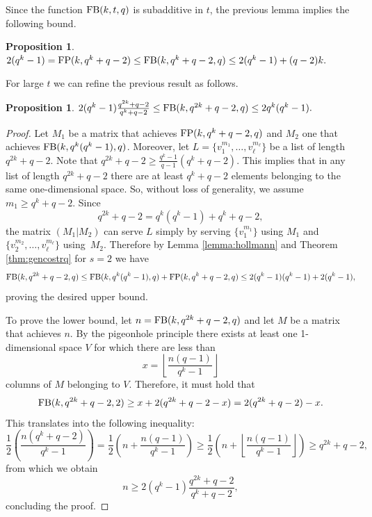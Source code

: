 \documentclass[11pt,a4paper]{article}
\theoremstyle{definition}
\newtheorem{proposition}[theorem]{Proposition}
\newcommand{\fb}{\textnormal{FB}}
\newcommand{\fp}{\textnormal{FP}}
\begin{document}
Since the function $\fb(k,t,q)$ is subadditive in $t$, the previous lemma implies the following bound.

\begin{proposition}\label{proposition:conjbound}
$2(q^k-1)=\fp(k,q^k+q-2)\leq\fb(k,q^k+q-2,q)\leq 2(q^k-1)+(q-2)k.$
\end{proposition}

For large $t$ we can refine the previous result as follows.

\begin{proposition}
$2(q^k-1)\frac{q^{2k}+q-2}{q^k+q-2}\leq\fb(k,q^{2k}+q-2,q)\leq 2q^k(q^k-1).$
\end{proposition}
\begin{proof}
    Let $M_1$ be a matrix that achieves $\fp(k,q^k+q-2,q)$ and $M_2$ one that achieves  $\fb(k,q^{k}(q^{k}-1),q)$. Moreover, let $L=\{v_1^{m_1},\dots, v_{\ell}^{m_{\ell}}\}$ be a list of length $q^{2k}+q-2$. Note that $q^{2k}+q-2\geq\frac{q^k-1}{q-1}(q^k+q-2)$. This implies that in any list of length $q^{2k}+q-2$ there are at least $q^k+q-2$ elements belonging to the same one-dimensional space. So, without loss of generality, we assume $m_1\geq q^k+q-2$.
    Since    
    $$q^{2k}+q-2 = q^k(q^k-1)+q^k+q-2,$$
    the matrix $(M_1|M_2)$ can serve $L$ simply by serving $\{v_1^{m_1}\}$ using $M_1$ and~$\{v_2^{m_2},\dots, v_{\ell}^{m_{\ell}}\}$ using~$M_2$. Therefore
    by Lemma \ref{lemma:hollmann} and Theorem \ref{thm:gencostrq} for $s=2$ we have
    \begin{equation*}
        \fb(k,q^{2k}+q-2,q)\leq \fb(k,q^{k}(q^{k}-1),q)+\fp(k,q^k+q-2,q)\leq 2(q^k-1)(q^k-1)+2(q^k-1),
    \end{equation*}
proving the desired upper bound. 

To prove the lower bound, let $n=\fb(k,q^{2k}+q-2,q)$ and let $M$ be a matrix that achieves $n$. By the pigeonhole principle there exists at least one 1-dimensional space $V$ for which there are less than
    $$x = \left\lfloor\frac{n(q-1)}{q^k-1}\right\rfloor$$
    columns of $M$ belonging to $V$. Therefore, it must hold that
$$\fb(k,q^{2k}+q-2,2) \ge x+2(q^{2k}+q-2-x) = 2(q^{2k}+q-2)-x.$$ This translates into the following inequality:
    \begin{equation*}
        \frac{1}{2}\left(\frac{n(q^k+q-2)}{q^k-1}\right)=\frac{1}{2}\left(n+\frac{n(q-1)}{q^k-1}\right)\geq\frac{1}{2}\left(n+\left\lfloor\frac{n(q-1)}{q^k-1}\right\rfloor\right)\geq q^{2k}+q-2,
    \end{equation*}
    from which we obtain
    \begin{equation*}
        n\geq 2(q^k-1)\frac{q^{2k}+q-2}{q^k+q-2},
    \end{equation*}
    concluding the proof.
\end{proof}
\end{document}
